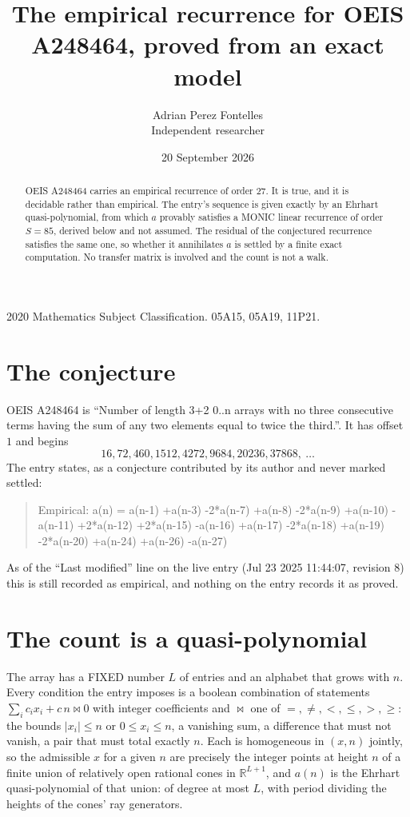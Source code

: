 \documentclass[11pt,a4paper]{article}
\title{The empirical recurrence for OEIS A248464, proved from an exact model}
\author{Adrian Perez Fontelles\\ \small Independent researcher}
\date{20 September 2026}
\theoremstyle{plain}
\theoremstyle{definition}
\begin{document}
\maketitle

\begin{abstract}
OEIS A248464 carries an empirical recurrence of order $27$. It is true, and it is
decidable rather than empirical. The entry's sequence is given exactly by an Ehrhart quasi-polynomial, from
which $a$ provably satisfies a MONIC linear recurrence of order $S=85$, derived below and not
assumed. The residual of the conjectured recurrence satisfies the same one, so whether it
annihilates $a$ is settled by a finite exact computation. No transfer matrix is involved and the count is not a walk.
\end{abstract}

\noindent\small 2020 Mathematics Subject Classification. 05A15, 05A19, 11P21.\normalsize

\section{The conjecture}

OEIS A248464 is ``Number of length 3+2 0..n arrays with no three consecutive terms having the sum of any two elements equal to twice the third.''. It has offset $1$ and begins
\[
16, 72, 460, 1512, 4272, 9684, 20236, 37868,\ \dots
\]
The entry states, as a conjecture contributed by its author and never marked settled:
\begin{quote}
Empirical: a(n) = a(n-1) +a(n-3) -2*a(n-7) +a(n-8) -2*a(n-9) +a(n-10) -a(n-11) +2*a(n-12) +2*a(n-15) -a(n-16) +a(n-17) -2*a(n-18) +a(n-19) -2*a(n-20) +a(n-24) +a(n-26) -a(n-27)
\end{quote}
As of the ``Last modified'' line on the live entry (Jul 23 2025 11:44:07, revision 8)
this is still recorded as empirical, and nothing on the entry records it as proved.

\section{The count is a quasi-polynomial}

The array has a FIXED number $L$ of entries and an alphabet that grows with $n$. Every
condition the entry imposes is a boolean combination of statements
$\sum_i c_ix_i + c\,n \bowtie 0$ with integer coefficients and $\bowtie$ one of
$=,\ne,<,\le,>,\ge$: the bounds $|x_i|\le n$ or $0\le x_i\le n$, a vanishing sum, a difference
that must not vanish, a pair that must total exactly $n$. Each is homogeneous in $(x,n)$
jointly, so the admissible $x$ for a given $n$ are precisely the integer points at height $n$
of a finite union of relatively open rational cones in $\mathbb{R}^{L+1}$, and $a(n)$ is
the Ehrhart quasi-polynomial of that union: of degree at most $L$, with period dividing the
heights of the cones' ray generators.
\end{document}
